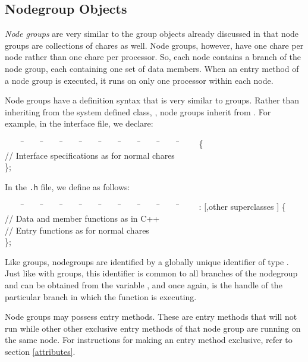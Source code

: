\subsection{Nodegroup Objects}

{\it Node groups}   are very
similar to the group objects already discussed in that node groups are
collections of chares as well.  Node groups, however, have one chare
per node rather than one chare per processor.
So, each node contains a branch of the node group, each containing one
set of data members.  When an entry method of a node group is
executed, it runs on only one processor within each
node.

Node groups have a definition syntax that is very similar to groups.  Rather
than inheriting from the system defined class, , node groups 
inherit from .  For example, in the interface file, we declare:

\begin{tabbing}
~~~~ \=~~~~ \=~~~~ \=~~~~ \=~~~~ \=~~~~ \=~~~~ \=~~~~ \=~~~~ \=~~~~ \kill
\>   \{ \\
\> \> // Interface specifications as for normal chares \\
\> \};
\end{tabbing}

In the {\tt .h} file, we define  as follows:

\begin{tabbing}
~~~~ \=~~~~ \=~~~~ \=~~~~ \=~~~~ \=~~~~ \=~~~~ \=~~~~ \=~~~~ \=~~~~ \kill
\>   :  [,other
superclasses ] \{ \\
\> \> // Data and member functions as in C++ \\
\> \> // Entry functions as for normal chares \\
\> \};
\end{tabbing}

Like groups, nodegroups are identified by a globally unique identifier
of type .  Just like with groups, this 
identifier is
common to all branches of the nodegroup and can be obtained from the
variable , and once again, 
 is the handle of the particular branch in which the function 
is executing.

Node groups may possess  entry methods.  
These are entry methods that will not run while other other exclusive entry 
methods of that node group are running on the same node.  For instructions 
for making an entry method exclusive, refer to section \ref{attributes}.

